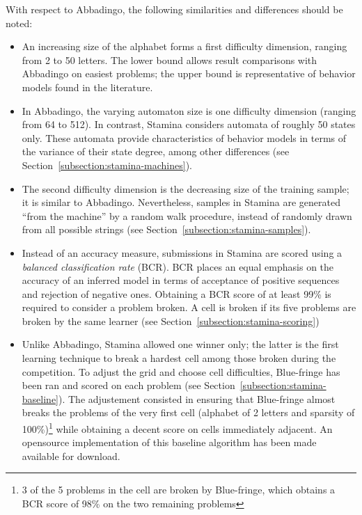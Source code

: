 With respect to Abbadingo, the following similarities and differences should be noted:

\begin{itemize}

\item An increasing size of the alphabet forms a first difficulty dimension, ranging from 2 to 50 letters. The lower bound allows result comparisons with Abbadingo on easiest problems; the upper bound is representative of behavior models found in the literature.

\item In Abbadingo, the varying automaton size is one difficulty dimension (ranging from 64 to 512). In contrast, Stamina considers automata of roughly 50 states only. These automata provide characteristics of behavior models in terms of the variance of their state degree, among other differences (see Section~\ref{subsection:stamina-machines}).

\item The second difficulty dimension is the decreasing size of the training sample; it is similar to Abbadingo. Nevertheless, samples in Stamina are generated ``from the machine'' by a random walk procedure, instead of randomly drawn from all possible strings (see Section~\ref{subsection:stamina-samples}).

\item Instead of an accuracy measure, submissions in Stamina are scored using a \emph{balanced classification rate} (BCR). BCR places an equal emphasis on the accuracy of an inferred model in terms of acceptance of positive sequences and rejection of negative ones. Obtaining a BCR score of at least 99\% is required to consider a problem broken. A cell is broken if its five problems are broken by the same learner (see Section~\ref{subsection:stamina-scoring})

\item Unlike Abbadingo, Stamina allowed one winner only; the latter is the first learning technique to break a hardest cell among those broken during the competition. To adjust the grid and choose cell difficulties, Blue-fringe has been ran and scored on each problem (see Section~\ref{subsection:stamina-baseline}). The adjustement consisted in ensuring that Blue-fringe almost breaks the problems of the very first cell (alphabet of 2 letters and sparsity of 100\%)\footnote{3 of the 5 problems in the cell are broken by Blue-fringe, which obtains a BCR score of 98\% on the two remaining problems} while obtaining a decent score on cells immediately adjacent. An opensource implementation of this baseline algorithm has been made available for download.

\end{itemize}

